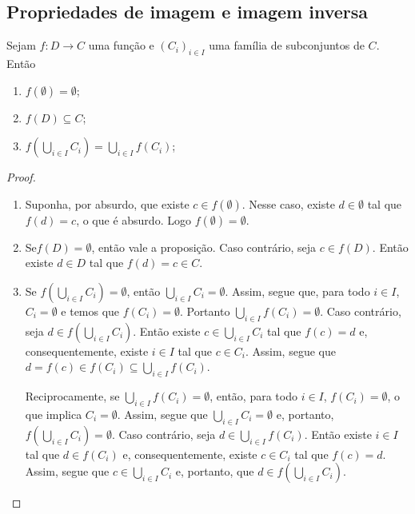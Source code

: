 \subsection{Propriedades de imagem e imagem inversa}

\begin{proposition}
	Sejam $f: D \to C$ uma função e $(C_i)_{i \in I}$ uma família de subconjuntos de $C$. Então
	\begin{enumerate}
	\item $f(\emptyset) = \emptyset$;
	\item $f(D) \subseteq C$;
	\item $f\left(\displaystyle\bigcup_{i \in I} C_i \right) = \displaystyle\bigcup_{i \in I} f(C_i)$;
	\end{enumerate}
\end{proposition}
\begin{proof}
	\begin{enumerate}
	\item Suponha, por absurdo, que existe $c \in f(\emptyset)$. Nesse caso, existe $d \in \emptyset$ tal que $f(d) = c$, o que é absurdo. Logo $f(\emptyset) = \emptyset$.
	\item Se$f(D)=\emptyset$, então vale a proposição. Caso contrário, seja $c \in f(D)$. Então existe $d \in D$ tal que $f(d)=c \in C$.
	\item Se $f \left( \bigcup_{i \in I} C_i \right) = \emptyset$, então $\bigcup_{i \in I} C_i = \emptyset$. Assim, segue que, para todo $i \in I$, $C_i = \emptyset$ e temos que $f(C_i)=\emptyset$. Portanto $\bigcup_{i \in I} f(C_i) = \emptyset$. Caso contrário, seja $d \in f \left( \bigcup_{i \in I} C_i \right)$. Então existe $c \in \bigcup_{i \in I} C_i$ tal que $f(c)=d$ e, consequentemente, existe $i \in I$ tal que $c \in C_i$. Assim, segue que $d=f(c) \in f(C_i) \subseteq \bigcup_{i \in I} f(C_i)$.
	
	Reciprocamente, se $\bigcup_{i \in I} f(C_i) = \emptyset$, então, para todo $i \in I$, $f(C_i) = \emptyset$, o que implica $C_i = \emptyset$. Assim, segue que $\bigcup_{i \in I} C_i = \emptyset$ e, portanto, $f\left(\bigcup_{i \in I} C_i \right) = \emptyset$. Caso contrário, seja $d \in \bigcup_{i \in I} f(C_i)$. Então existe $i \in I$ tal que $d \in f(C_i)$ e, consequentemente, existe $c \in C_i$ tal que $f(c)=d$. Assim, segue que $c \in \bigcup_{i \in I} C_i$ e, portanto, que $d \in f\left(\bigcup_{i \in I} C_i \right)$.
	\end{enumerate}
\end{proof}

